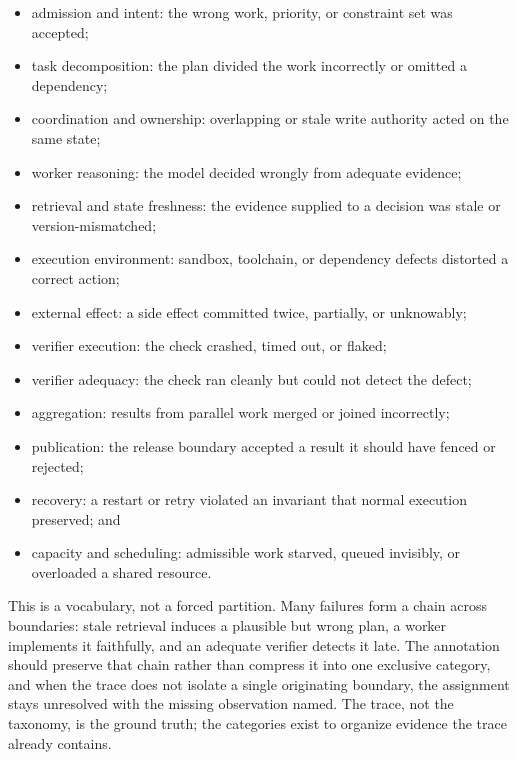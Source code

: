 \begin{itemize}
\tightlist
\item
  admission and intent: the wrong work, priority, or constraint set was accepted;
\item
  task decomposition: the plan divided the work incorrectly or omitted a dependency;
\item
  coordination and ownership: overlapping or stale write authority acted on the same state;
\item
  worker reasoning: the model decided wrongly from adequate evidence;
\item
  retrieval and state freshness: the evidence supplied to a decision was stale or version-mismatched;
\item
  execution environment: sandbox, toolchain, or dependency defects distorted a correct action;
\item
  external effect: a side effect committed twice, partially, or unknowably;
\item
  verifier execution: the check crashed, timed out, or flaked;
\item
  verifier adequacy: the check ran cleanly but could not detect the defect;
\item
  aggregation: results from parallel work merged or joined incorrectly;
\item
  publication: the release boundary accepted a result it should have fenced or rejected;
\item
  recovery: a restart or retry violated an invariant that normal execution preserved; and
\item
  capacity and scheduling: admissible work starved, queued invisibly, or overloaded a shared resource.
\end{itemize}

This is a vocabulary, not a forced partition. Many failures form a chain across boundaries: stale retrieval induces a plausible but wrong plan, a worker implements it faithfully, and an adequate verifier detects it late. The annotation should preserve that chain rather than compress it into one exclusive category, and when the trace does not isolate a single originating boundary, the assignment stays unresolved with the missing observation named. The trace, not the taxonomy, is the ground truth; the categories exist to organize evidence the trace already contains.

